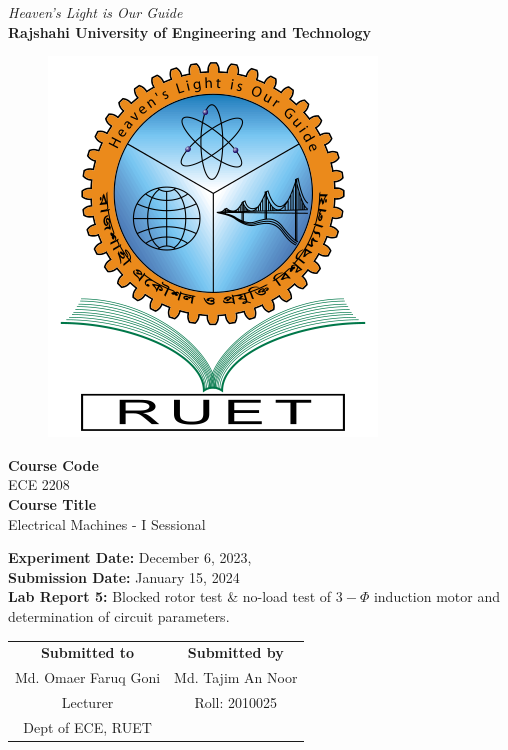 \vspace*{\fill}
\begin{center}

    \emph{Heaven's Light is Our Guide} \\
    \textbf{Rajshahi University of Engineering and Technology} \\

    \begin{figure}[h]
        \centering
        \includegraphics[scale=.34]{images/RUET_logo.png}
        \label{fig:ruet_logo}
    \end{figure}
    \vspace{5mm}

    \textbf{Course Code}\\
    ECE 2208\\
    \vspace{3mm}
    \textbf{Course Title}\\
    Electrical Machines - I Sessional

    \vspace{5mm}
    \textbf{Experiment Date:} {December 6, 2023,}\\
    \textbf{Submission Date:} {January 15, 2024}\\

    \vspace{5mm}
    \textbf{Lab Report 5:} Blocked rotor test \& no-load test of \(3-\Phi\) induction motor and determination of circuit parameters.\\

    \vspace{15mm}

    \begin{tabular}{c|c}
        \textbf{Submitted to} & \textbf{Submitted by} \\
        Md. Omaer Faruq Goni  & Md. Tajim An Noor     \\
        Lecturer              & Roll: 2010025         \\
        Dept of ECE, RUET     &                       \\
    \end{tabular}

\end{center}
\vspace*{\fill}

